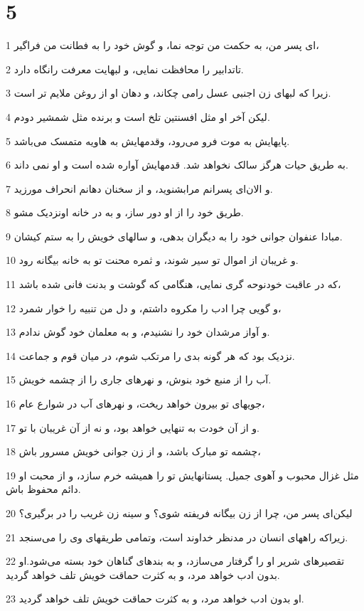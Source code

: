\chapter{5}

\par 1 ای پسر من، به حکمت من توجه نما، و گوش خود را به فطانت من فراگیر،
\par 2 تاتدابیر را محافظت نمایی، و لبهایت معرفت رانگاه دارد.
\par 3 زیرا که لبهای زن اجنبی عسل رامی چکاند، و دهان او از روغن ملایم تر است.
\par 4 لیکن آخر او مثل افسنتین تلخ است و برنده مثل شمشیر دودم.
\par 5 پایهایش به موت فرو می‌رود، وقدمهایش به هاویه متمسک می‌باشد.
\par 6 به طریق حیات هرگز سالک نخواهد شد. قدمهایش آواره شده است و او نمی داند.
\par 7 و الان‌ای پسرانم مرابشنوید، و از سخنان دهانم انحراف مورزید.
\par 8 طریق خود را از او دور ساز، و به در خانه اونزدیک مشو.
\par 9 مبادا عنفوان جوانی خود را به دیگران بدهی، و سالهای خویش را به ستم کیشان. 
\par 10 و غریبان از اموال تو سیر شوند، و ثمره محنت تو به خانه بیگانه رود.
\par 11 که در عاقبت خودنوحه گری نمایی، هنگامی که گوشت و بدنت فانی شده باشد،
\par 12 و گویی چرا ادب را مکروه داشتم، و دل من تنبیه را خوار شمرد،
\par 13 و آواز مرشدان خود را نشنیدم، و به معلمان خود گوش ندادم.
\par 14 نزدیک بود که هر گونه بدی را مرتکب شوم، در میان قوم و جماعت.
\par 15 آب را از منبع خود بنوش، و نهرهای جاری را از چشمه خویش.
\par 16 جویهای تو بیرون خواهد ریخت، و نهرهای آب در شوارع عام،
\par 17 و از آن خودت به تنهایی خواهد بود، و نه از آن غریبان با تو.
\par 18 چشمه تو مبارک باشد، و از زن جوانی خویش مسرور باش،
\par 19 مثل غزال محبوب و آهوی جمیل. پستانهایش تو را همیشه خرم سازد، و از محبت او دائم محفوظ باش.
\par 20 لیکن‌ای پسر من، چرا از زن بیگانه فریفته شوی؟ و سینه زن غریب را در بر‌گیری؟
\par 21 زیراکه راههای انسان در مدنظر خداوند است، وتمامی طریقهای وی را می‌سنجد.
\par 22 تقصیرهای شریر او را گرفتار می‌سازد، و به بندهای گناهان خود بسته می‌شود.او بدون ادب خواهد مرد، و به کثرت حماقت خویش تلف خواهد گردید.
\par 23 او بدون ادب خواهد مرد، و به کثرت حماقت خویش تلف خواهد گردید.
 
